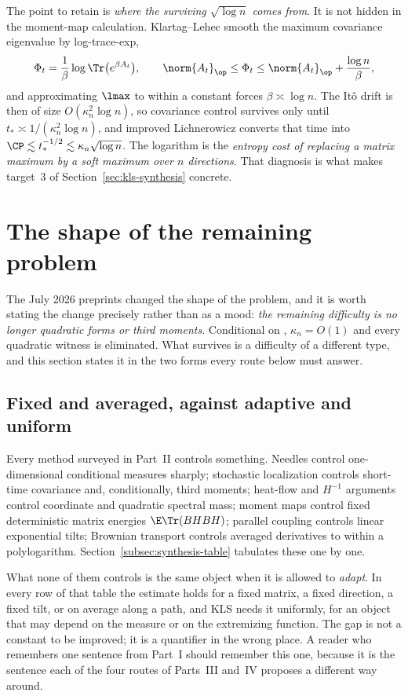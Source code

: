 \documentclass[../../main.tex]{subfiles}
\begin{document}
The point to retain is \emph{where the surviving $\sqrt{\log n}$ comes from}. It is not hidden in
the moment-map calculation. Klartag--Lehec smooth the maximum covariance eigenvalue by
log-trace-exp,
\[
  \Phi_t=\frac1\beta\log\Tr\bigl(e^{\beta A_t}\bigr),
  \qquad
  \norm{A_t}_\op\le\Phi_t\le\norm{A_t}_\op+\frac{\log n}\beta ,
\]
and approximating $\lmax$ to within a constant forces $\beta\asymp\log n$. The It\^o drift is then
of size $O(\kappa_n^2\log n)$, so covariance control survives only until
$t_*\asymp1/(\kappa_n^2\log n)$, and improved Lichnerowicz converts that time into
$\CP\lesssim t_*^{-1/2}\lesssim\kappa_n\sqrt{\log n}$. The logarithm is the \emph{entropy cost of
replacing a matrix maximum by a soft maximum over $n$ directions}. That diagnosis is what makes
target~3 of Section~\ref{sec:kls-synthesis} concrete.

\section{The shape of the remaining problem}
\label{sec:kls-remaining}

The July 2026 preprints changed the shape of the problem, and it is worth stating the change
precisely rather than as a mood: \emph{the remaining difficulty is no longer quadratic forms or
third moments}. Conditional on \cite{Letwin2026QuadraticKLS}, $\kappa_n=O(1)$ and every quadratic
witness is eliminated. What survives is a difficulty of a different type, and this section states
it in the two forms every route below must answer.

\subsection{Fixed and averaged, against adaptive and uniform}
\label{subsec:kls-adaptive-residue}

Every method surveyed in Part~II controls something. Needles control one-dimensional conditional
measures sharply; stochastic localization controls short-time covariance and, conditionally,
third moments; heat-flow and $H^{-1}$ arguments control coordinate and quadratic spectral mass;
moment maps control fixed deterministic matrix energies $\E\Tr(BHBH)$; parallel coupling controls
linear exponential tilts; Brownian transport controls averaged derivatives to within a
polylogarithm. Section~\ref{subsec:synthesis-table} tabulates these one by one.

What none of them controls is the same object when it is allowed to \emph{adapt}. In every row of
that table the estimate holds for a fixed matrix, a fixed direction, a fixed tilt, or on average
along a path, and KLS needs it uniformly, for an object that may depend on the measure or on the
extremizing function. The gap is not a constant to be improved; it is a quantifier in the wrong
place. A reader who remembers one sentence from Part~I should remember this one, because it is the
sentence each of the four routes of Parts~III and~IV proposes a different way around.
\end{document}
